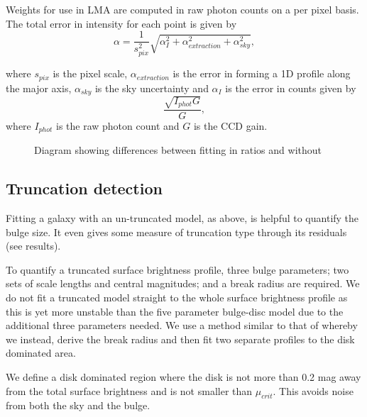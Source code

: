 Weights for use in LMA are computed in raw photon counts on a per pixel basis. The total error in intensity for each point is given by 
\begin{equation}
	\alpha = \frac{1}{s_{pix}^2}\sqrt{\alpha_I^2 + \alpha_{extraction}^2 + \alpha_{sky}^2},
\end{equation}

where $s_{pix}$ is the pixel scale, $\alpha_{extraction}$ is the error in forming a 1D profile along the major axis, $\alpha_{sky}$ is the sky uncertainty and $\alpha_I$ is the error in counts given by 
\begin{equation}
	\frac{\sqrt{I_{phot}G}}{G},
\end{equation}
where $I_{phot}$ is the raw photon count and $G$ is the CCD gain.

\begin{figure}
	\caption{Diagram showing differences between fitting in ratios and without}
\end{figure}

\subsection{Truncation detection}
Fitting a galaxy with an un-truncated model, as above, is helpful to quantify the bulge size. It even gives some measure of truncation type through its residuals (see results). 

To quantify a truncated surface brightness profile, three bulge parameters; two sets of scale lengths and central magnitudes; and a break radius are required. We do not fit a truncated model straight to the whole surface brightness profile as this is yet more unstable than the five parameter bulge-disc model due to the additional three parameters needed. We use a method similar to that of \citet{pohlen_structure_2006} whereby we instead, derive the break radius and then fit two separate profiles to the disk dominated area.

We define a disk dominated region where the disk is not more than 0.2 mag away from the total surface brightness and is not smaller than $\mu_{crit}$. This avoids noise from both the sky and the bulge.

